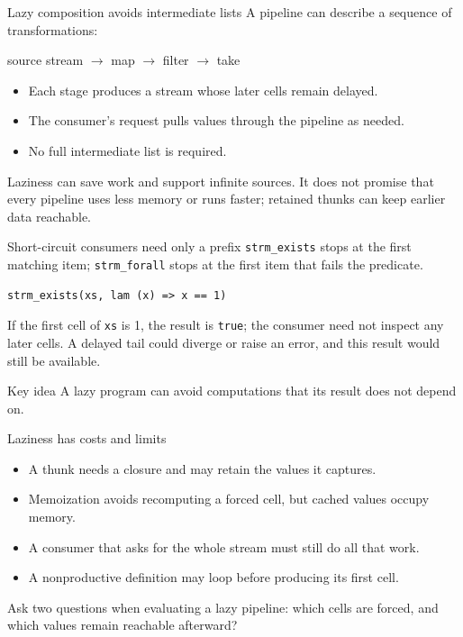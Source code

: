 \documentclass[aspectratio=169,10pt]{beamer}
\begin{document}
\begin{frame}{Lazy composition avoids intermediate lists}
  A pipeline can describe a sequence of transformations:
  \begin{center}
    source stream \quad $\longrightarrow$ \quad map \quad $\longrightarrow$
    \quad filter \quad $\longrightarrow$ \quad take
  \end{center}
  \begin{itemize}
    \item Each stage produces a stream whose later cells remain delayed.
    \item The consumer's request pulls values through the pipeline as needed.
    \item No full intermediate list is required.
  \end{itemize}
  Laziness can save work and support infinite sources. It does not promise that
  every pipeline uses less memory or runs faster; retained thunks can keep
  earlier data reachable.
\end{frame}

\begin{frame}[fragile]{Short-circuit consumers need only a prefix}
  \texttt{strm\_exists} stops at the first matching item; \texttt{strm\_forall}
  stops at the first item that fails the predicate.
  \begin{lstlisting}
strm_exists(xs, lam (x) => x == 1)
  \end{lstlisting}
  If the first cell of \texttt{xs} is 1, the result is \texttt{true}; the
  consumer need not inspect any later cells. A delayed tail could diverge or
  raise an error, and this result would still be available.
  \begin{block}{Key idea}
    A lazy program can avoid computations that its result does not depend on.
  \end{block}
\end{frame}

\begin{frame}{Laziness has costs and limits}
  \begin{itemize}
    \item A thunk needs a closure and may retain the values it captures.
    \item Memoization avoids recomputing a forced cell, but cached values occupy memory.
    \item A consumer that asks for the whole stream must still do all that work.
    \item A nonproductive definition may loop before producing its first cell.
  \end{itemize}
  Ask two questions when evaluating a lazy pipeline: which cells are forced,
  and which values remain reachable afterward?
\end{frame}
\end{document}
